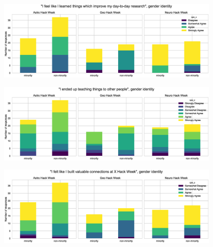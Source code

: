 \documentclass{aastex62}
\begin{document}
\begin{figure}[h!]
\centering
\includegraphics[width=\textwidth]{Q24_4_Q27_stackedbars.eps}
\caption{}
\label{fig:survey}
\end{figure}

\begin{figure}[h!]
\centering
\includegraphics[width=\textwidth]{Q23_2_Q27_stackedbars.eps}
\caption{}
\label{fig:survey}
\end{figure}

\begin{figure}[h!]
\centering
\includegraphics[width=\textwidth]{Q24_5_Q27_stackedbars.eps}
\caption{}
\label{fig:survey}
\end{figure}
\end{document}
